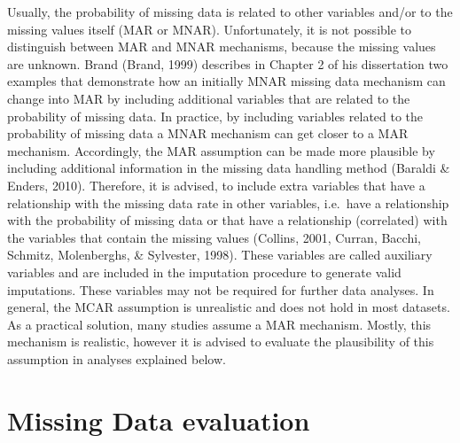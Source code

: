 \documentclass[]{book}
\begin{document}
Usually, the probability of missing data is related to other variables
and/or to the missing values itself (MAR or MNAR). Unfortunately, it is
not possible to distinguish between MAR and MNAR mechanisms, because the
missing values are unknown. Brand (Brand, 1999) describes in Chapter 2
of his dissertation two examples that demonstrate how an initially MNAR
missing data mechanism can change into MAR by including additional
variables that are related to the probability of missing data. In
practice, by including variables related to the probability of missing
data a MNAR mechanism can get closer to a MAR mechanism. Accordingly,
the MAR assumption can be made more plausible by including additional
information in the missing data handling method (Baraldi \& Enders,
2010). Therefore, it is advised, to include extra variables that have a
relationship with the missing data rate in other variables, i.e.~have a
relationship with the probability of missing data or that have a
relationship (correlated) with the variables that contain the missing
values (Collins, 2001, Curran, Bacchi, Schmitz, Molenberghs, \&
Sylvester, 1998). These variables are called auxiliary variables and are
included in the imputation procedure to generate valid imputations.
These variables may not be required for further data analyses. In
general, the MCAR assumption is unrealistic and does not hold in most
datasets. As a practical solution, many studies assume a MAR mechanism.
Mostly, this mechanism is realistic, however it is advised to evaluate
the plausibility of this assumption in analyses explained below.

\section{Missing Data evaluation}\label{missing-data-evaluation-1}
\end{document}
